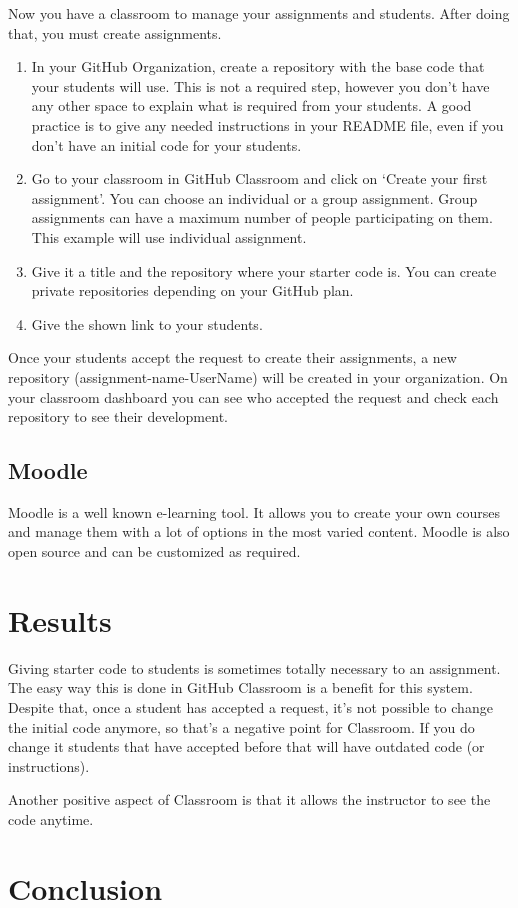 \documentclass[12pt]{article}
\begin{document}
Now you have a classroom to manage your assignments and students. After doing that, you must create assignments.

\begin{enumerate}

\item In your GitHub Organization, create a repository with the base code that your students will use. This is not a required step, however you don't have any other space to explain what is required from your students. A good practice is to give any needed instructions in your README file, even if you don't have an initial code for your students.

\item Go to your classroom in GitHub Classroom and click on `Create your first assignment'. You can choose an individual or a group assignment. Group assignments can have a maximum number of people participating on them. This example will use individual assignment.

\item Give it a title and the repository where your starter code is. You can create private repositories depending on your GitHub plan.

\item Give the shown link to your students. 

\end{enumerate}

Once your students accept the request to create their assignments, a new repository (assignment-name-UserName) will be created in your organization. On your classroom dashboard you can see who accepted the request and check each repository to see their development.


\subsection{Moodle}

Moodle is a well known e-learning tool. It allows you to create your own courses and manage them with a lot of options in the most varied content. Moodle is also open source and can be customized as required.


\section{Results}

Giving starter code to students is sometimes totally necessary to an assignment. The easy way this is done in GitHub Classroom is a benefit for this system. Despite that, once a student has accepted a request, it's not possible to change the initial code anymore, so that's a negative point for Classroom. If you do change it students that have accepted before that will have outdated code (or instructions).

Another positive aspect of Classroom is that it allows the instructor to see the code anytime.


\section{Conclusion}
\end{document}
